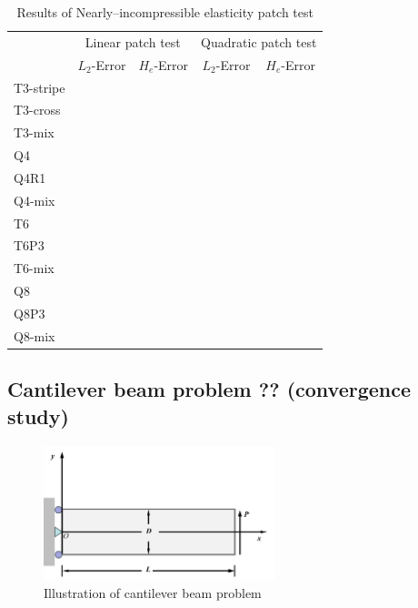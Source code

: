 \begin{table}[!ht]
\centering
\caption{Results of Nearly--incompressible elasticity patch test}\label{patchtest_result}
\begin{tabular}{lcccc}
\toprule
 & \multicolumn{2}{c}{Linear patch test} & \multicolumn{2}{c}{Quadratic patch test} \\ \cline{2-5}
 & $L_2$-Error & $H_e$-Error & $L_2$-Error & $H_e$-Error \\
\midrule
    T3-stripe & & & & \\
    T3-cross & & & & \\
    T3-mix & & & & \\
    Q4 & & & & \\
    Q4R1 & & & & \\
    Q4-mix & & & \\
    T6 & & & & \\
    T6P3 & & & & \\
    T6-mix & & & & \\
    Q8 & & & & \\
    Q8P3 & & & & \\
    Q8-mix & & & & \\
\bottomrule
\end{tabular}
\end{table}

\subsection{Cantilever beam problem ?? (convergence study)}

\begin{figure}[!ht]
\centering
\includegraphics[width=0.6\textwidth]{png/cantilever.png}
\caption{Illustration of cantilever beam problem}\label{cantilever_illsutration}
\end{figure}

